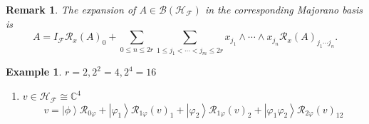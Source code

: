 \documentclass[aps,preprint]{revtex4}%
\newtheorem{example}[theorem]{Example}
\newtheorem{remark}[theorem]{Remark}
\begin{document}
\begin{remark}
The expansion of $A\in\mathcal{B}\left(  \mathcal{H}_{\mathcal{F}}\right)  $
in the corresponding Majorano basis is
\begin{equation}
A=I_{\mathcal{F}}\mathcal{R}_{x}\left(  A\right)  _{0}+\sum_{0\leq n\leq
2r}\sum_{1\leq j_{1}<\cdots<j_{m}\leq2r}x_{j_{1}}\wedge\cdots\wedge x_{j_{n}%
}\mathcal{R}_{x}\left(  A\right)  _{j_{1}\cdots j_{n}}.
\end{equation}

\end{remark}

\begin{example}
$r=2,2^{2}=4,2^{4}=16$

\begin{enumerate}
\item $v\in\mathcal{H}_{\mathcal{F}}\cong\mathbb{C}^{4}$%
\begin{equation}
v=\left\vert \phi\right\rangle \mathcal{R}_{0\varphi}+\left\vert \varphi
_{1}\right\rangle \mathcal{R}_{1\varphi}\left(  v\right)  _{1}+\left\vert
\varphi_{2}\right\rangle \mathcal{R}_{1\varphi}\left(  v\right)
_{2}+\left\vert \varphi_{1}\varphi_{2}\right\rangle \mathcal{R}_{2\varphi
}\left(  v\right)  _{12}%
\end{equation}



\end{enumerate}
\end{example}
\end{document}
